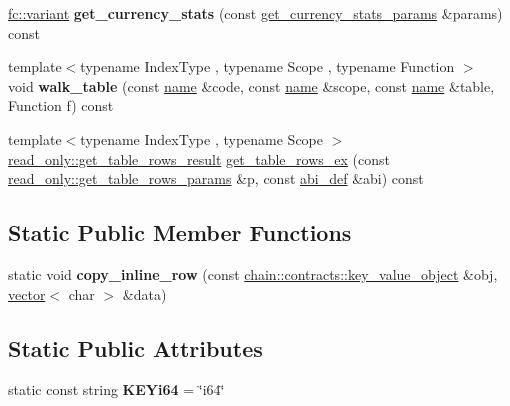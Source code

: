 \begin{DoxyCompactItemize}
\mbox{\hyperlink{classfc_1_1variant}{fc\+::variant}} {\bfseries get\+\_\+currency\+\_\+stats} (const \mbox{\hyperlink{structaacio_1_1chain__apis_1_1read__only_1_1get__currency__stats__params}{get\+\_\+currency\+\_\+stats\+\_\+params}} \&params) const
\item 
\mbox{\label{classaacio_1_1chain__apis_1_1read__only_a9c51d1cda7dcdd4c6cd50149c2b9f431}} 
{\footnotesize template$<$typename Index\+Type , typename Scope , typename Function $>$ }\\void {\bfseries walk\+\_\+table} (const \mbox{\hyperlink{structaacio_1_1name}{name}} \&code, const \mbox{\hyperlink{structaacio_1_1name}{name}} \&scope, const \mbox{\hyperlink{structaacio_1_1name}{name}} \&table, Function f) const
\item 
{\footnotesize template$<$typename Index\+Type , typename Scope $>$ }\\\mbox{\hyperlink{structaacio_1_1chain__apis_1_1read__only_1_1get__table__rows__result}{read\+\_\+only\+::get\+\_\+table\+\_\+rows\+\_\+result}} \mbox{\hyperlink{classaacio_1_1chain__apis_1_1read__only_ae87764c63b35b8891805dcb93d6ce8cd}{get\+\_\+table\+\_\+rows\+\_\+ex}} (const \mbox{\hyperlink{structaacio_1_1chain__apis_1_1read__only_1_1get__table__rows__params}{read\+\_\+only\+::get\+\_\+table\+\_\+rows\+\_\+params}} \&p, const \mbox{\hyperlink{structaacio_1_1chain_1_1contracts_1_1abi__def}{abi\+\_\+def}} \&abi) const
\end{DoxyCompactItemize}
\subsection*{Static Public Member Functions}
\begin{DoxyCompactItemize}
\item 
\mbox{\label{classaacio_1_1chain__apis_1_1read__only_a3027ff2adb15bf25492aad8909eebf07}} 
static void {\bfseries copy\+\_\+inline\+\_\+row} (const \mbox{\hyperlink{structaacio_1_1chain_1_1contracts_1_1key__value__object}{chain\+::contracts\+::key\+\_\+value\+\_\+object}} \&obj, \mbox{\hyperlink{classstd_1_1vector}{vector}}$<$ char $>$ \&data)
\end{DoxyCompactItemize}
\subsection*{Static Public Attributes}
\begin{DoxyCompactItemize}
\item 
\mbox{\label{classaacio_1_1chain__apis_1_1read__only_ad6889fdc350d1b05fcb4c8cc6d63f3a8}} 
static const string {\bfseries K\+E\+Yi64} = \char`\"{}i64\char`\"{}
\end{DoxyCompactItemize}
